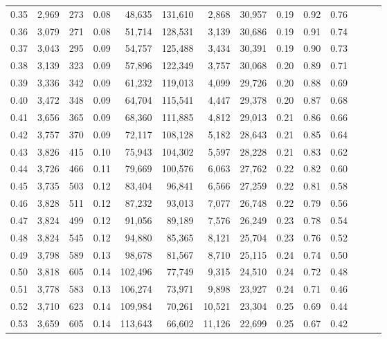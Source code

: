 \begin{tabular}{rrrrrrrrrrrrrr}
0.35 &  2,969 &  273 &  0.08 &   48,635 &  131,610 &   2,868 &  30,957 &  0.19 &  0.92 &      0.76 \\
0.36 &  3,079 &  271 &  0.08 &   51,714 &  128,531 &   3,139 &  30,686 &  0.19 &  0.91 &      0.74 \\
0.37 &  3,043 &  295 &  0.09 &   54,757 &  125,488 &   3,434 &  30,391 &  0.19 &  0.90 &      0.73 \\
0.38 &  3,139 &  323 &  0.09 &   57,896 &  122,349 &   3,757 &  30,068 &  0.20 &  0.89 &      0.71 \\
0.39 &  3,336 &  342 &  0.09 &   61,232 &  119,013 &   4,099 &  29,726 &  0.20 &  0.88 &      0.69 \\
0.40 &  3,472 &  348 &  0.09 &   64,704 &  115,541 &   4,447 &  29,378 &  0.20 &  0.87 &      0.68 \\
0.41 &  3,656 &  365 &  0.09 &   68,360 &  111,885 &   4,812 &  29,013 &  0.21 &  0.86 &      0.66 \\
0.42 &  3,757 &  370 &  0.09 &   72,117 &  108,128 &   5,182 &  28,643 &  0.21 &  0.85 &      0.64 \\
0.43 &  3,826 &  415 &  0.10 &   75,943 &  104,302 &   5,597 &  28,228 &  0.21 &  0.83 &      0.62 \\
0.44 &  3,726 &  466 &  0.11 &   79,669 &  100,576 &   6,063 &  27,762 &  0.22 &  0.82 &      0.60 \\
0.45 &  3,735 &  503 &  0.12 &   83,404 &   96,841 &   6,566 &  27,259 &  0.22 &  0.81 &      0.58 \\
0.46 &  3,828 &  511 &  0.12 &   87,232 &   93,013 &   7,077 &  26,748 &  0.22 &  0.79 &      0.56 \\
0.47 &  3,824 &  499 &  0.12 &   91,056 &   89,189 &   7,576 &  26,249 &  0.23 &  0.78 &      0.54 \\
0.48 &  3,824 &  545 &  0.12 &   94,880 &   85,365 &   8,121 &  25,704 &  0.23 &  0.76 &      0.52 \\
0.49 &  3,798 &  589 &  0.13 &   98,678 &   81,567 &   8,710 &  25,115 &  0.24 &  0.74 &      0.50 \\
0.50 &  3,818 &  605 &  0.14 &  102,496 &   77,749 &   9,315 &  24,510 &  0.24 &  0.72 &      0.48 \\
0.51 &  3,778 &  583 &  0.13 &  106,274 &   73,971 &   9,898 &  23,927 &  0.24 &  0.71 &      0.46 \\
0.52 &  3,710 &  623 &  0.14 &  109,984 &   70,261 &  10,521 &  23,304 &  0.25 &  0.69 &      0.44 \\
0.53 &  3,659 &  605 &  0.14 &  113,643 &   66,602 &  11,126 &  22,699 &  0.25 &  0.67 &      0.42 \\

\end{tabular}
